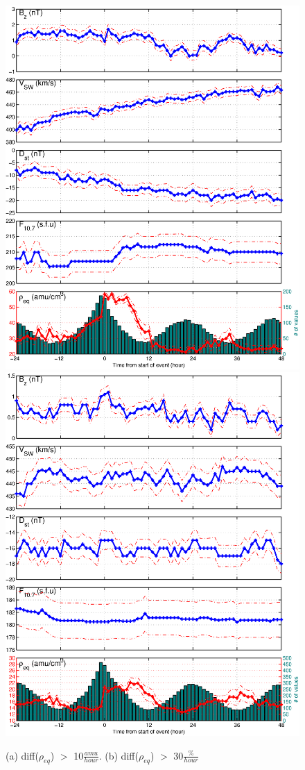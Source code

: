 \documentclass[10pt,twocolumn]{article}
\begin{document}
\begin{figure}[htp!]
\centering
\includegraphics[scale=0.45]{paperfigures/stormavs-diffden-10amu.eps}
\includegraphics[scale=0.45]{paperfigures/stormavs-diffden-30percent.eps}
\caption{(a) diff($\rho_{eq}$) $>$ 10$\frac{amu}{hour}$. (b) diff($\rho_{eq}$) $>$ 30$\frac{\%}{hour}$}
\label{rhochange}
\end{figure}
\end{document}
